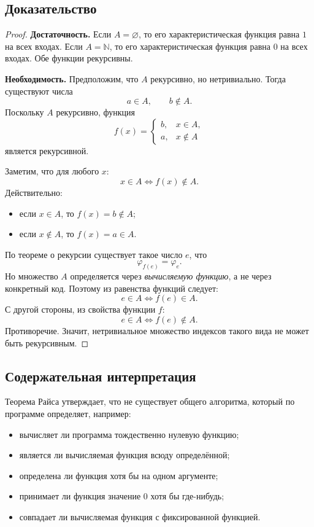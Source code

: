 \documentclass[12pt,a4paper]{article}
\begin{document}
\subsection{Доказательство}
\begin{proof}
\textbf{Достаточность.}
Если $A=\varnothing$, то его характеристическая функция равна $1$ на всех входах.
Если $A=\mathbb N$, то его характеристическая функция равна $0$ на всех входах.
Обе функции рекурсивны.

\textbf{Необходимость.}
Предположим, что $A$ рекурсивно, но нетривиально. Тогда существуют числа
\[
a\in A,\qquad b\notin A.
\]
Поскольку $A$ рекурсивно, функция
\[
f(x)=
\begin{cases}
b, & x\in A,\\
a, & x\notin A
\end{cases}
\]
является рекурсивной.

Заметим, что для любого $x$:
\[
x\in A \iff f(x)\notin A.
\]
Действительно:
\begin{itemize}
    \item если $x\in A$, то $f(x)=b\notin A$;
    \item если $x\notin A$, то $f(x)=a\in A$.
\end{itemize}

По теореме о рекурсии существует такое число $e$, что
\[
\varphi_{f(e)}=\varphi_e.
\]
Но множество $A$ определяется через \emph{вычисляемую функцию}, а не через конкретный код. Поэтому из равенства функций следует:
\[
e\in A \iff f(e)\in A.
\]
С другой стороны, из свойства функции $f$:
\[
e\in A \iff f(e)\notin A.
\]
Противоречие. Значит, нетривиальное множество индексов такого вида не может быть рекурсивным.
\end{proof}

\subsection{Содержательная интерпретация}
Теорема Райса утверждает, что не существует общего алгоритма, который по программе определяет, например:
\begin{itemize}
    \item вычисляет ли программа тождественно нулевую функцию;
    \item является ли вычисляемая функция всюду определённой;
    \item определена ли функция хотя бы на одном аргументе;
    \item принимает ли функция значение $0$ хотя бы где-нибудь;
    \item совпадает ли вычисляемая функция с фиксированной функцией.
\end{itemize}
\end{document}
